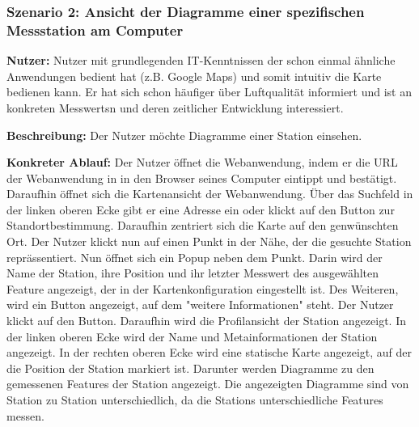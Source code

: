\subsubsection*{Szenario 2: Ansicht der Diagramme einer spezifischen Messstation am Computer}
\textbf{Nutzer:} Nutzer mit grundlegenden IT-Kenntnissen der schon einmal ähnliche Anwendungen bedient hat (z.B. Google Maps) 
und somit intuitiv die Karte bedienen kann. Er hat sich schon häufiger über Luftqualität informiert und ist an konkreten 
\glspl{Messwert}n und deren zeitlicher Entwicklung interessiert.

\textbf{Beschreibung:} Der Nutzer möchte Diagramme einer \gls{Station} einsehen.

\textbf{Konkreter Ablauf:} Der Nutzer öffnet die \gls{Webanwendung}, indem er die URL der \gls{Webanwendung} in in den Browser seines Computer eintippt 
und bestätigt. Daraufhin öffnet sich die Kartenansicht der \gls{Webanwendung}. Über das Suchfeld in der linken oberen Ecke gibt 
er eine Adresse ein oder klickt auf den Button zur Standortbestimmung. Daraufhin zentriert sich die Karte auf den genwünschten Ort. 
Der Nutzer klickt nun auf einen Punkt in der Nähe, der die gesuchte \gls{Station} reprässentiert. Nun öffnet sich ein Popup neben 
dem Punkt. Darin wird der Name der \gls{Station}, ihre Position und ihr letzter \gls{Messwert} des ausgewählten \gls{Feature} 
angezeigt, der in der Kartenkonfiguration eingestellt ist. Des Weiteren, wird ein Button angezeigt, auf dem "weitere Informationen" 
steht. Der Nutzer klickt auf den Button.
Daraufhin wird die Profilansicht der \gls{Station} angezeigt. In der linken oberen Ecke wird der Name und Metainformationen 
der \gls{Station} angezeigt. In der rechten oberen Ecke wird eine statische Karte angezeigt, auf der die Position der \gls{Station} 
markiert ist.
Darunter werden Diagramme zu den gemessenen Features der \gls{Station} angezeigt. Die angezeigten Diagramme sind von \gls{Station} 
zu \gls{Station} unterschiedlich, da die \glspl{Station} unterschiedliche Features messen.